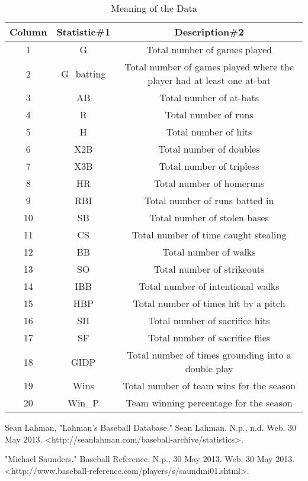 \documentclass{article}
\begin{document}
\begin{table}[ht]
\caption{Meaning of the Data} %
\centering %
\begin{tabular}{c c c} %
\hline\hline %
Column & Statistic\#1 & Description\#2 \\ [0.5ex] %
\hline %
1 & G & Total number of games played \\ %
2 & G\_batting & Total number of games played where the player had at least one at-bat \\
3 & AB & Total number of at-bats \\
4 & R & Total number of runs \\
5 & H & Total number of hits \\
6 & X2B & Total number of doubles \\
7 & X3B & Total number of tripless \\
8 & HR & Total number of homeruns \\
9 & RBI & Total number of runs batted in \\
10 & SB & Total number of stolen bases \\
11 & CS & Total number of time caught stealing \\
12 & BB & Total number of walks \\
13 & SO & Total number of strikeouts \\
14 & IBB & Total number of intentional walks \\
15 & HBP & Total number of times hit by a pitch \\
16 & SH & Total number of sacrifice hits \\
17 & SF & Total number of sacrifice flies \\
18 & GIDP & Total number of times grounding into a double play \\
19 & Wins & Total number of team wins for the season \\
20 & Win\_P & Team winning percentage for the season \\ [1ex] %
\hline %
\end{tabular}
\label{table:data} %
\end{table}
\begin{thebibliography}{9}

  Sean Lahman,
  "Lahman's Baseball Database."
  Sean Lahman. N.p., n.d. Web. 30 May 2013.
  \textless http://seanlahman.com/baseball-archive/statistics\textgreater.

  "Michael Saunders." Baseball Reference. N.p., 30 May 2013. Web. 30 May 2013. \textless http://www.baseball-reference.com/players/s/saundmi01.shtml\textgreater.

\end{thebibliography}
\end{document}
